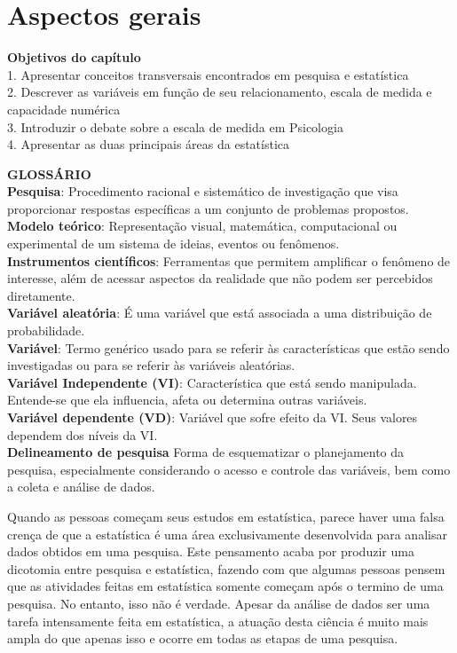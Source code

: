 \documentclass[
]{book}
\newenvironment{objectives}{
  \definecolor{shadecolor}{rgb}{0.764,0.992,0.686}  %
  \color{black}
  \begin{shaded}}
 {\end{shaded}}
\begin{document}
\hypertarget{aspectos-gerais}{%
\chapter{Aspectos gerais}\label{aspectos-gerais}}

\begin{objectives}
\textbf{Objetivos do capítulo}\\
1. Apresentar conceitos transversais encontrados em pesquisa e estatística\\
2. Descrever as variáveis em função de seu relacionamento, escala de medida e capacidade numérica\\
3. Introduzir o debate sobre a escala de medida em Psicologia\\
4. Apresentar as duas principais áreas da estatística

\end{objectives}

\textbf{GLOSSÁRIO}\\
\textbf{Pesquisa}: Procedimento racional e sistemático de investigação que visa proporcionar respostas específicas a um conjunto de problemas propostos.\\
\textbf{Modelo teórico}: Representação visual, matemática, computacional ou experimental de um sistema de ideias, eventos ou fenômenos.\\
\textbf{Instrumentos científicos}: Ferramentas que permitem amplificar o fenômeno de interesse, além de acessar aspectos da realidade que não podem ser percebidos diretamente.\\
\textbf{Variável aleatória}: É uma variável que está associada a uma distribuição de probabilidade.\\
\textbf{Variável}: Termo genérico usado para se referir às características que estão sendo investigadas ou para se referir às variáveis aleatórias.\\
\textbf{Variável Independente (VI)}: Característica que está sendo manipulada. Entende-se que ela influencia, afeta ou determina outras variáveis.\\
\textbf{Variável dependente (VD)}: Variável que sofre efeito da VI. Seus valores dependem dos níveis da VI.\\
\textbf{Delineamento de pesquisa} Forma de esquematizar o planejamento da pesquisa, especialmente considerando o acesso e controle das variáveis, bem como a coleta e análise de dados.

Quando as pessoas começam seus estudos em estatística, parece haver uma falsa crença de que a estatística é uma área exclusivamente desenvolvida para analisar dados obtidos em uma pesquisa. Este pensamento acaba por produzir uma dicotomia entre pesquisa e estatística, fazendo com que algumas pessoas pensem que as atividades feitas em estatística somente começam após o termino de uma pesquisa. No entanto, isso não é verdade. Apesar da análise de dados ser uma tarefa intensamente feita em estatística, a atuação desta ciência é muito mais ampla do que apenas isso e ocorre em todas as etapas de uma pesquisa.
\end{document}
